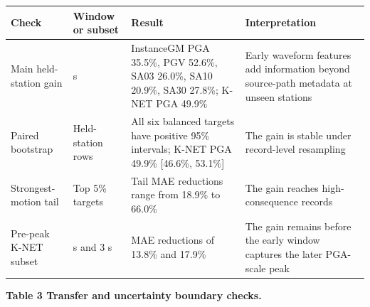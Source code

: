 \documentclass[
  10pt,
]{article}
\newcounter{none} %
\begin{document}
{\def\LTcaptype{none} %
\begin{longtable}[]{@{}
  >{\raggedright\arraybackslash}p{}
  >{\raggedright\arraybackslash}p{}
  >{\raggedright\arraybackslash}p{}
  >{\raggedright\arraybackslash}p{}@{}}
\toprule\noalign{}
\begin{minipage}[b]{\linewidth}\raggedright
Check
\end{minipage} & \begin{minipage}[b]{\linewidth}\raggedright
Window or subset
\end{minipage} & \begin{minipage}[b]{\linewidth}\raggedright
Result
\end{minipage} & \begin{minipage}[b]{\linewidth}\raggedright
Interpretation
\end{minipage} \\
\midrule\noalign{}
\endhead
\bottomrule\noalign{}
\endlastfoot
Main held-station gain & 10 s & InstanceGM PGA 35.5\%, PGV 52.6\%, SA03
26.0\%, SA10 20.9\%, SA30 27.8\%; K-NET PGA 49.9\% & Early waveform
features add information beyond source-path metadata at unseen
stations \\
Paired bootstrap & Held-station rows & All six balanced targets have
positive 95\% intervals; K-NET PGA 49.9\% {[}46.6\%, 53.1\%{]} & The
gain is stable under record-level resampling \\
Strongest-motion tail & Top 5\% targets & Tail MAE reductions range from
18.9\% to 66.0\% & The gain reaches high-consequence records \\
Pre-peak K-NET subset & 1 s and 3 s & MAE reductions of 13.8\% and
17.9\% & The gain remains before the early window captures the later
PGA-scale peak \\
\end{longtable}
}

\textbf{Table 3 \textbar{} Transfer and uncertainty boundary checks.}
\end{document}
